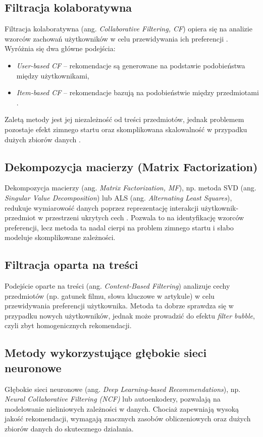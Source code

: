 \documentclass[a4paper,onecolumn]{LTJournalArticle}
\begin{document}
\subsection{Filtracja kolaboratywna}
Filtracja kolaboratywna (ang. \textit{Collaborative Filtering, CF}) opiera się na analizie wzorców zachowań użytkowników w celu przewidywania ich preferencji \cite{he2016ups}. Wyróżnia się dwa główne podejścia:
\begin{itemize}
	\item \textit{User-based CF} – rekomendacje są generowane na podstawie podobieństwa między użytkownikami,
	\item \textit{Item-based CF} – rekomendacje bazują na podobieństwie między przedmiotami \cite{linden2003amazon}.
\end{itemize}
Zaletą metody jest jej niezależność od treści przedmiotów, jednak problemem pozostaje efekt zimnego startu oraz skomplikowana skalowalność w przypadku dużych zbiorów danych \cite{koren2009matrix}.


\subsection{Dekompozycja macierzy (Matrix Factorization)}
Dekompozycja macierzy (ang. \textit{Matrix Factorization, MF}), np. metoda SVD (ang. \textit{Singular Value Decomposition}) \cite{cao2018joint} lub ALS (ang. \textit{Alternating Least Squares}), redukuje wymiarowość danych poprzez reprezentację interakcji użytkownik-przedmiot w przestrzeni ukrytych cech \cite{koren2009matrix}. Pozwala to na identyfikację wzorców preferencji, lecz metoda ta nadal cierpi na problem zimnego startu i słabo modeluje skomplikowane zależności.

\subsection{Filtracja oparta na treści}
Podejście oparte na treści (ang. \textit{Content-Based Filtering}) analizuje cechy przedmiotów (np. gatunek filmu, słowa kluczowe w artykule) w celu przewidywania preferencji użytkownika. Metoda ta dobrze sprawdza się w przypadku nowych użytkowników, jednak może prowadzić do efektu \textit{filter bubble}, czyli zbyt homogenicznych rekomendacji.

\subsection{Metody wykorzystujące głębokie sieci neuronowe}
Głębokie sieci neuronowe (ang. \textit{Deep Learning-based Recommendations}), np. \textit{Neural Collaborative Filtering (NCF)} lub autoenkodery, pozwalają na modelowanie nieliniowych zależności w danych. Chociaż zapewniają wysoką jakość rekomendacji, wymagają znacznych zasobów obliczeniowych oraz dużych zbiorów danych do skutecznego działania.
\end{document}
